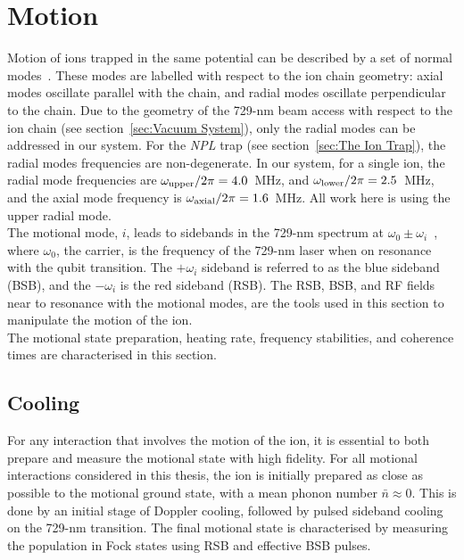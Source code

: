 \section{Motion}
\label{sec:Motion}

    Motion of ions trapped in the same potential can be described by a set of normal modes~\cite{james1998quantum}. These modes are labelled with respect to the ion chain geometry: axial modes oscillate parallel with the chain, and radial modes oscillate perpendicular to the chain. Due to the geometry of the 729-nm beam access with respect to the ion chain (see section~\ref{sec:Vacuum System}), only the radial modes can be addressed in our system. For the \emph{NPL} trap (see section~\ref{sec:The Ion Trap}), the radial modes frequencies are non-degenerate. In our system, for a single ion, the radial mode frequencies are $\omega_{\rm upper}/2\pi = 4.0$~\unit{\MHz}, and $\omega_{\rm lower}/2\pi = 2.5$~\unit{\MHz}, and the axial mode frequency is $\omega_{\rm axial}/2\pi = 1.6$~\unit{\MHz}. All work here is using the upper radial mode. \\
    The motional mode, $i$, leads to sidebands in the 729-nm spectrum at $\omega_0 \pm \omega_{i}$~\cite{ozeri2011tutorial}, where $\omega_0$, the carrier, is the frequency of the 729-nm laser when on resonance with the qubit transition. The $+\omega_i$ sideband is referred to as the blue sideband (BSB), and the $-\omega_i$ is the red sideband (RSB).
    The RSB, BSB, and RF fields near to resonance with the motional modes, are the tools used in this section to manipulate the motion of the ion.\\
    The motional state preparation, heating rate, frequency stabilities, and coherence times are characterised in this section.

\subsection{Cooling}
\label{sec:Cooling}

    For any interaction that involves the motion of the ion, it is essential to both prepare and measure the motional state with high fidelity. For all motional interactions considered in this thesis, the ion is initially prepared as close as possible to the motional ground state, with a mean phonon number $\bar{n} \approx 0$. This is done by an initial stage of Doppler cooling, followed by pulsed sideband cooling on the 729-nm transition. The final motional state is characterised by measuring the population in Fock states using RSB and effective BSB pulses.\\

